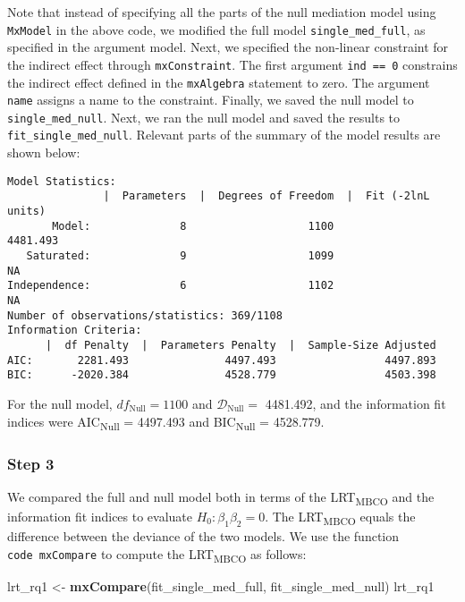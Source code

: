 \documentclass[11pt,]{article}
\newenvironment{Shaded}{\begin{snugshade}}{\end{snugshade}}
\newcommand{\KeywordTok}[1]{\textcolor[rgb]{0.13,0.29,0.53}{\textbf{#1}}}
\newcommand{\NormalTok}[1]{#1}
\newcommand{\StringTok}[1]{\textcolor[rgb]{0.31,0.60,0.02}{#1}}
\begin{document}
Note that instead of specifying all the parts of the null mediation
model using \texttt{MxModel} in the above code, we modified the full
model \texttt{single\_med\_full}, as specified in the argument model.
Next, we specified the non-linear constraint for the indirect effect
through \texttt{mxConstraint}. The first argument \texttt{ind\ ==\ 0}
constrains the indirect effect defined in the \texttt{mxAlgebra}
statement to zero. The argument \texttt{name} assigns a name to the
constraint. Finally, we saved the null model to
\texttt{single\_med\_null}. Next, we ran the null model and saved the
results to \texttt{fit\_single\_med\_null}. Relevant parts of the
summary of the model results are shown below:

\begin{verbatim}
Model Statistics: 
               |  Parameters  |  Degrees of Freedom  |  Fit (-2lnL units)
       Model:              8                   1100              4481.493
   Saturated:              9                   1099                    NA
Independence:              6                   1102                    NA
Number of observations/statistics: 369/1108
Information Criteria: 
      |  df Penalty  |  Parameters Penalty  |  Sample-Size Adjusted
AIC:       2281.493               4497.493                 4497.893
BIC:      -2020.384               4528.779                 4503.398
\end{verbatim}

For the null model, \(df_\text{Null}= 1100\) and
\(\mathcal{D}_\text{Null}=\) 4481.492, and the information fit indices
were AIC\textsubscript{Null} = 4497.493 and BIC\textsubscript{Null} =
4528.779.

\hypertarget{step-3}{%
\subsubsection{Step 3}\label{step-3}}

We compared the full and null model both in terms of the
LRT\textsubscript{MBCO} and the information fit indices to evaluate
\(H_0: \beta_1 \beta_2 =0\). The LRT\textsubscript{MBCO} equals the
difference between the deviance of the two models. We use the function
\texttt{code\ mxCompare} to compute the LRT\textsubscript{MBCO} as
follows:

\begin{Shaded}
\begin{Highlighting}[]
\NormalTok{lrt_rq1 <-}\StringTok{ }\KeywordTok{mxCompare}\NormalTok{(fit_single_med_full, fit_single_med_null) }
\NormalTok{lrt_rq1}
\end{Highlighting}
\end{Shaded}
\end{document}
